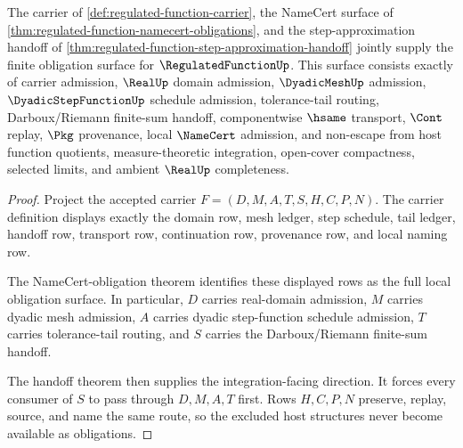 \begin{theorem}
\label{thm:regulated-function-obligation-closure-package}
The carrier of \autoref{def:regulated-function-carrier}, the NameCert surface of \autoref{thm:regulated-function-namecert-obligations}, and the step-approximation handoff of \autoref{thm:regulated-function-step-approximation-handoff} jointly supply the finite obligation surface for $\RegulatedFunctionUp$. This surface consists exactly of carrier admission, $\RealUp$ domain admission, $\DyadicMeshUp$ admission, $\DyadicStepFunctionUp$ schedule admission, tolerance-tail routing, Darboux/Riemann finite-sum handoff, componentwise $\hsame$ transport, $\Cont$ replay, $\Pkg$ provenance, local $\NameCert$ admission, and non-escape from host function quotients, measure-theoretic integration, open-cover compactness, selected limits, and ambient $\RealUp$ completeness.
\end{theorem}
\begin{proof}
Project the accepted carrier $F=(D,M,A,T,S,H,C,P,N)$. The carrier definition displays exactly the domain row, mesh ledger, step schedule, tail ledger, handoff row, transport row, continuation row, provenance row, and local naming row.

The NameCert-obligation theorem identifies these displayed rows as the full local obligation surface. In particular, $D$ carries real-domain admission, $M$ carries dyadic mesh admission, $A$ carries dyadic step-function schedule admission, $T$ carries tolerance-tail routing, and $S$ carries the Darboux/Riemann finite-sum handoff.

The handoff theorem then supplies the integration-facing direction. It forces every consumer of $S$ to pass through $D,M,A,T$ first. Rows $H,C,P,N$ preserve, replay, source, and name the same route, so the excluded host structures never become available as obligations.
\end{proof}

